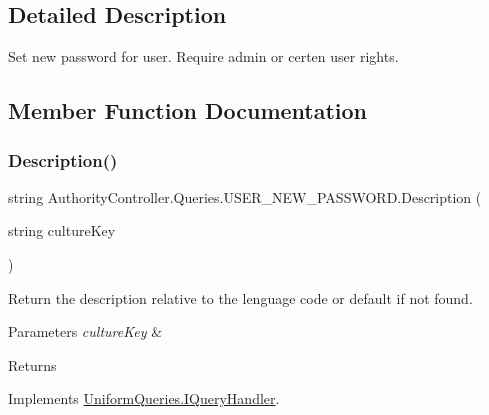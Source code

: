 \subsection{Detailed Description}
Set new password for user. Require admin or certen user rights. 



\subsection{Member Function Documentation}
\mbox{\label{class_authority_controller_1_1_queries_1_1_u_s_e_r___n_e_w___p_a_s_s_w_o_r_d_a04d2af1732d4ac353076d489fe75c696}} 
\subsubsection{\texorpdfstring{Description()}{Description()}}
{\footnotesize\ttfamily string Authority\+Controller.\+Queries.\+U\+S\+E\+R\+\_\+\+N\+E\+W\+\_\+\+P\+A\+S\+S\+W\+O\+R\+D.\+Description (\begin{DoxyParamCaption}\item[{string}]{culture\+Key }\end{DoxyParamCaption})}



Return the description relative to the lenguage code or default if not found. 


\begin{DoxyParams}{Parameters}
{\em culture\+Key} & \\
\hline
\end{DoxyParams}
\begin{DoxyReturn}{Returns}

\end{DoxyReturn}


Implements \mbox{\hyperlink{interface_uniform_queries_1_1_i_query_handler_abe2d1124630ca8d74b7398d11c873526}{Uniform\+Queries.\+I\+Query\+Handler}}.

